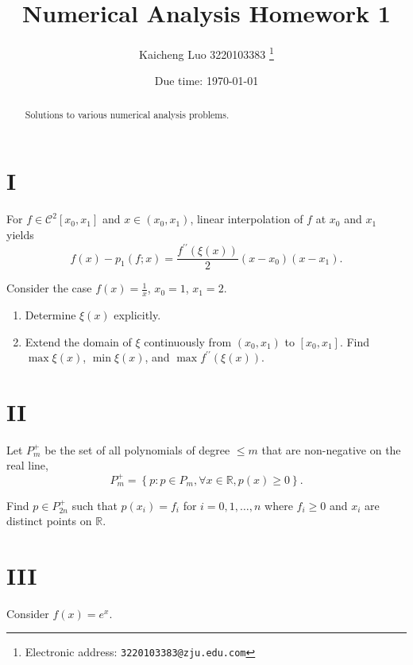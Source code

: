 \documentclass[a4paper]{article}
\begin{document}
\title{Numerical Analysis Homework 1}

\author{Kaicheng Luo 3220103383
  \thanks{Electronic address: \texttt{3220103383@zju.edu.com}}}

\date{Due time: \today}

\maketitle

\begin{abstract}
    Solutions to various numerical analysis problems.
\end{abstract}

\section*{I}
For \( f \in \mathcal{C}^{2}[x_{0}, x_{1}] \) and \( x \in (x_{0}, x_{1}) \), linear interpolation of \( f \) at \( x_{0} \) and \( x_{1} \) yields
\[
f(x) - p_1(f; x) = \frac{f^{\prime\prime}(\xi(x))}{2}(x - x_0)(x - x_1).
\]

Consider the case \( f(x) = \frac{1}{x} \), \( x_{0} = 1 \), \( x_{1} = 2 \).

\begin{enumerate}
    \item Determine \( \xi(x) \) explicitly.
    \item Extend the domain of \( \xi \) continuously from \( (x_{0}, x_{1}) \) to \( [x_{0}, x_{1}] \). Find \( \max \xi(x) \), \( \min \xi(x) \), and \( \max f^{\prime\prime}(\xi(x)) \).
\end{enumerate}

\section*{II}
Let \( P_{m}^{+} \) be the set of all polynomials of degree \( \leq m \) that are non-negative on the real line,
\[
P_{m}^{+} = \left\{ p : p \in P_{m}, \forall x \in \mathbb{R}, p(x) \geq 0 \right\}.
\]

Find \( p \in P_{2n}^{+} \) such that \( p(x_{i}) = f_{i} \) for \( i = 0, 1, \ldots, n \) where \( f_{i} \geq 0 \) and \( x_{i} \) are distinct points on \( \mathbb{R} \).

\section*{III}
Consider \( f(x) = e^{x} \).
\end{document}
